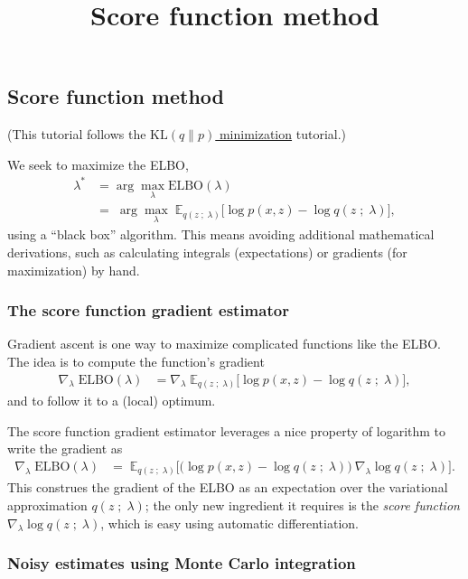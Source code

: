 \title{Score function method}

\subsection{Score function method}

(This tutorial follows the
\href{tut_KLqp.html}{$\text{KL}(q\|p)$ minimization} tutorial.)

We seek to maximize the ELBO,
\begin{align*}
  \lambda^*
  &=
  \arg \max_\lambda \text{ELBO}(\lambda)\\
  &=\;
  \arg \max_\lambda\;
  \mathbb{E}_{q(z\;;\;\lambda)}
  \big[
  \log p(x, z)
  -
  \log q(z\;;\;\lambda)
  \big],
\end{align*}
using a ``black box'' algorithm. This means avoiding additional
mathematical derivations, such as calculating integrals (expectations) or
gradients (for maximization) by hand.

\subsubsection{The score function gradient estimator}

Gradient ascent is one way to maximize complicated functions like the ELBO. The
idea is to compute the function's gradient
\begin{align*}
  \nabla_\lambda\;
  \text{ELBO}(\lambda)
  &=
  \nabla_\lambda\;
  \mathbb{E}_{q(z\;;\;\lambda)}
  \big[
  \log p(x, z)
  -
  \log q(z\;;\;\lambda)
  \big],
\end{align*}
and to follow it to a (local) optimum.

The score function gradient estimator leverages a nice property of logarithm to
write the gradient as
\begin{align*}
  \nabla_\lambda\;
  \text{ELBO}(\lambda)
  &=\; 
  \mathbb{E}_{q(z\;;\;\lambda)}
  \big[
  \big(
  \log p(x, z)
  -
  \log q(z\;;\;\lambda)
  \big)
  \:
  \nabla_\lambda \log q(z\;;\;\lambda)
  \big].
\end{align*}
This construes the gradient of the ELBO as an expectation over the variational
approximation $q(z\;;\;\lambda)$; the only new ingredient it requires is the 
\emph{score function} $\nabla_\lambda \log q(z\;;\;\lambda)$, which is easy
using automatic differentiation.

\subsubsection{Noisy estimates using Monte Carlo integration}

